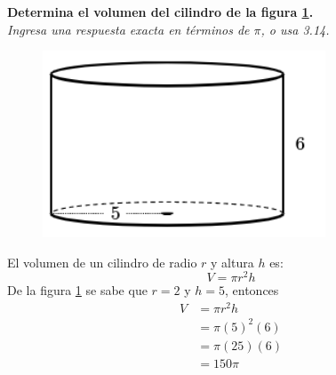 \textbf{Determina el volumen del cilindro de la figura \ref{fig:vol_cil_10}.}\\
\textit{Ingresa una respuesta exacta en términos de $\pi$, o usa 3.14.}

\begin{minipage}{0.3\linewidth}
    \begin{figure}[H]
        \begin{center}
            \includegraphics[width=0.75\textwidth]{../images/vol_cil_10.png}
        \end{center}
        \caption{}
        \label{fig:vol_cil_10}
    \end{figure}
\end{minipage}
\begin{minipage}{0.7\linewidth}
    \begin{solutionbox}{5cm}        El volumen de un cilindro de radio $r$ y altura $h$ es:
        \begin{equation*}
            V = \pi r^2 h
        \end{equation*}
        De la figura \ref{fig:vol_cil_10} se sabe que $r=2$ y $h=5$, entonces
        \begin{equation*}
            \begin{split}
                V & = \pi r^2 h\\
                & = \pi (5)^2 (6)\\
                & = \pi (25) (6)\\
                & = 150\pi
            \end{split}
        \end{equation*}
    \end{solutionbox}
\end{minipage}